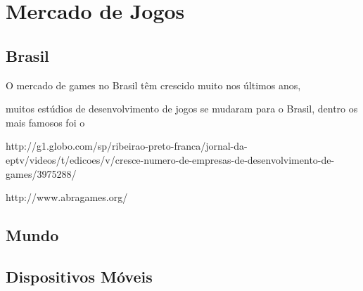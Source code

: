 
\chapter{Mercado de Jogos}
\label{cap:mercadoJogos}


\section{Brasil}

O mercado de games no Brasil têm crescido muito nos últimos anos, 

muitos estúdios de desenvolvimento de jogos se mudaram para o Brasil, dentro os mais famosos foi o 







http://g1.globo.com/sp/ribeirao-preto-franca/jornal-da-eptv/videos/t/edicoes/v/cresce-numero-de-empresas-de-desenvolvimento-de-games/3975288/

http://www.abragames.org/








\section{Mundo}



\section{Dispositivos Móveis}
